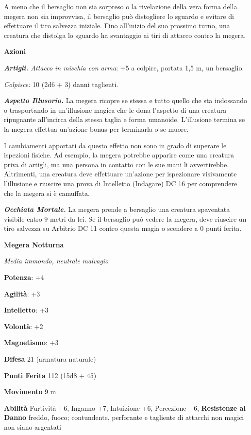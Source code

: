 \begin{multicols}{2}
A meno che il bersaglio non sia sorpreso o la rivelazione della vera
forma della megera non sia improvvisa, il bersaglio può distogliere lo
sguardo e evitare di effettuare il tiro salvezza iniziale. Fino
all'inizio del suo prossimo turno, una creatura che distolga lo sguardo
ha svantaggio ai tiri di attacco contro la megera.

\textbf{Azioni}

\emph{\textbf{Artigli.} Attacco in mischia con arma}: +5 a colpire,
portata 1,5 m, un bersaglio.

\emph{Colpisce:} 10 (2d6 + 3) danni taglienti.

\emph{\textbf{Aspetto Illusorio.}} La megera ricopre se stessa e tutto
quello che sta indossando o trasportando in un'illusione magica che le
dona l'aspetto di una creatura ripugnante all'incirca della stessa
taglia e forma umanoide. L'illusione termina se la megera effettua
un'azione bonus per terminarla o se muore.

I cambiamenti apportati da questo effetto non sono in grado di superare
le ispezioni fisiche. Ad esempio, la megera potrebbe apparire come una
creatura priva di artigli, ma una persona in contatto con le sue mani li
avvertirebbe. Altrimenti, una creatura deve effettuare un'azione per
ispezionare visivamente l'illusione e riuscire una prova di Intelletto
(Indagare) DC 16 per comprendere che la megera si è camuffata.

\emph{\textbf{Occhiata Mortale.}} La megera prende a bersaglio una
creatura spaventata visibile entro 9 metri da lei. Se il bersaglio può
vedere la megera, deve riuscire un tiro salvezza su Arbitrio DC 11
contro questa magia o scendere a 0 punti ferita.

\textbf{Megera Notturna}

\emph{Media immondo, neutrale malvagio}

\textbf{Potenza}: +4

\textbf{Agilità}: +3

\textbf{Intelletto}: +3

\textbf{Volontà}: +2

\textbf{Magnetismo}: +3

\textbf{Difesa} 21 (armatura naturale)

\textbf{Punti Ferita} 112 (15d8 + 45)

\textbf{Movimento} 9 m

\textbf{Abilità} Furtività +6, Inganno +7, Intuizione +6, Percezione +6,
\textbf{Resistenze al Danno} freddo, fuoco; contundente, perforante e
tagliente di attacchi non magici non siano argentati


\end{multicols}
